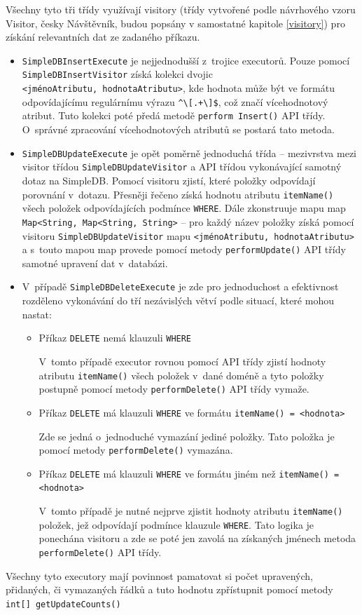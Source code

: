 \documentclass[oneside,12pt]{fithesis2}
\begin{document}
Všechny tyto tři třídy využívají visitory (třídy vytvořené podle návrhového vzoru Visitor, česky Návštěvník, budou popsány v samostatné kapitole \ref{visitory}) pro získání relevantních dat ze zadaného příkazu. 
\begin{itemize}
\item \texttt{SimpleDBInsertExecute} je nejjednodušší z~trojice executorů. Pouze pomocí \texttt{SimpleDBInsertVisitor} získá kolekci dvojic\\ \texttt{<jménoAtributu, hodnota\allowbreak Atributu>}, kde hodnota může být ve formátu odpovídajícímu regulárnímu výrazu \verb|^\[.+\]$|, což značí vícehodnotový atribut. Tuto kolekci poté předá metodě \texttt{perform Insert()} API třídy. O~správné zpracování vícehodnotových atributů se postará tato metoda.

\item \texttt{SimpleDBUpdateExecute} je opět poměrně jednoduchá třída -- mezivrstva mezi visitor třídou \texttt{SimpleDB\allowbreak UpdateVisitor} a API třídou vykonávající samotný dotaz na SimpleDB. Pomocí visitoru zjistí, které položky odpovídají porovnání v~dotazu. Přesněji řečeno získá hodnotu atributu \texttt{itemName()} všech položek odpovídajících podmínce \texttt{WHERE}. Dále zkonstruuje mapu map \texttt{Map<String, Map<String, String>} -- pro každý název položky získá pomocí visitoru \texttt{SimpleDBUpdate\allowbreak Visitor} mapu \texttt{<jméno\allowbreak Atributu, hodnotaAtributu>} a s~touto mapou map provede pomocí metody \texttt{performUpdate()} API třídy samotné upravení dat v~databázi.

\item V~případě \texttt{SimpleDBDeleteExecute} je zde pro jednoduchost a efektivnost rozděleno vykonávání do tří nezávislých větví podle situací, které mohou nastat:
\begin{itemize}
 \item Příkaz \texttt{DELETE} nemá klauzuli \texttt{WHERE}
 
  V~tomto případě executor rovnou pomocí API třídy zjistí hodnoty atributu \texttt{itemName()} všech položek v~dané doméně a tyto položky postupně pomocí metody \texttt{performDelete()} API třídy vymaže.
  
  \item Příkaz \texttt{DELETE} má klauzuli \texttt{WHERE} ve formátu \texttt{itemName() = <hodnota>}
  
  Zde se jedná o~jednoduché vymazání jediné položky. Tato položka je pomocí metody \texttt{performDelete()} vymazána.
  
\item Příkaz \texttt{DELETE} má klauzuli \texttt{WHERE} ve formátu jiném než \texttt{itemName() = <hodnota>}
  
  V~tomto případě je nutné nejprve zjistit hodnoty atributu \texttt{itemName()} položek, jež odpovídají podmínce klauzule \texttt{WHERE}. Tato logika je ponechána visitoru a zde se poté jen zavolá na získaných jménech metoda \texttt{performDelete()} API třídy.
\end{itemize}
\end{itemize}
Všechny tyto executory mají povinnost pamatovat si počet upravených, přidaných, či vymazaných řádků a tuto hodnotu zpřístupnit pomocí metody \texttt{int[] getUpdateCounts()}
\end{document}
